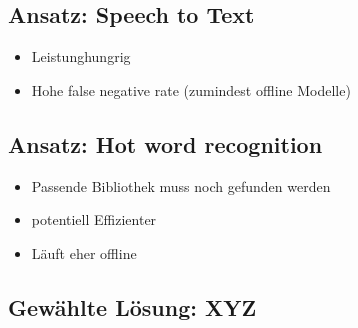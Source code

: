 \documentclass[../main.tex]{subfiles}
\begin{document}
\subsection{Ansatz: Speech to Text}

\begin{itemize}
    \item Leistunghungrig
    \item Hohe false negative rate (zumindest offline Modelle)
\end{itemize}

\subsection{Ansatz: Hot word recognition}

\begin{itemize}
    \item Passende Bibliothek muss noch gefunden werden
    \item potentiell Effizienter
    \item Läuft eher offline
\end{itemize}

\subsection{Gewählte Lösung: XYZ}
\end{document}

